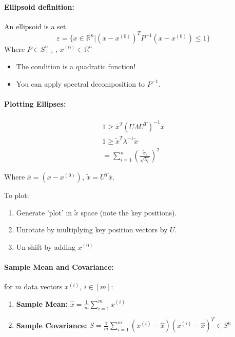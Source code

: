 \documentclass[a4paper,12pt]{report}
\def\reals{\mathbb{R}}
\begin{document}
\paragraph{Ellipsoid definition: } An ellipsoid is a set \begin{equation}
\varepsilon = \{x \in \reals^n | (x-x^{(0)})^T P^{-1} (x-x^{(0)}) \leq 1\}
\end{equation}
Where $P\in S^n_{++}$, $x^{(0)} \in \reals^n$
\begin{itemize}
\item The condition is a quadratic function!
\item You can apply spectral decomposition to $P^{-1}$.
\end{itemize}

\paragraph{Plotting Ellipses: } 
\begin{equation}
\begin{split}
1 \geq \bar{x}^T(U\Lambda U^T)^{-1} \bar{x} \\
1 \geq \tilde{x}^T \lambda^{-1} \tilde{x} \\
= \sum_{i=1}^{n} (\frac{\tilde{x}_i}{\sqrt{\lambda_i}})^2
\end{split}
\end{equation}

Where $\bar{x} = (x-x^{(0)})$, $\tilde{x} = U^T\bar{x}$.

To plot:
\begin{enumerate}
\item Generate 'plot' in $\tilde{x}$ space (note the key positions).
\item Unrotate by multiplying key position vectors by $U$.
\item Un-shift by adding $x^{(0)}$
\end{enumerate}


\paragraph{Sample Mean and Covariance: } for $m$ data vectors $x^{(i)}$, $i\in[m]$:
\begin{enumerate}
\item \textbf{Sample Mean: } $\hat{x} = \frac{1}{m} \sum_{i=1}^{m} x^{(i)}$
\item \textbf{Sample Covariance: } $S = \frac{1}{m} \sum_{i=1}^{m} (x^{(i)} - \hat{x})(x^{(i)} -\hat{x})^T \in S^n$
\end{enumerate}
\end{document}
